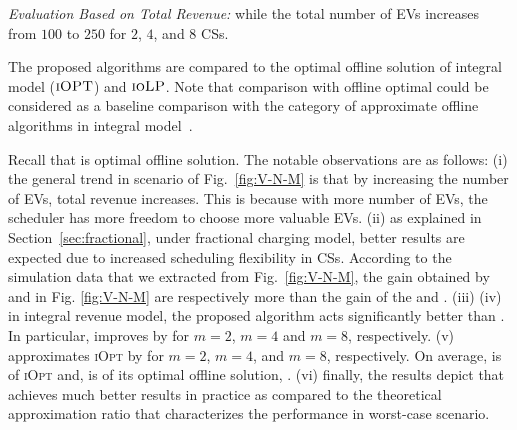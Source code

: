 \textit{Evaluation Based on Total Revenue:}
 while the total number of EVs increases from $100$ to $250$ for $2$, $4$, and $8$ CSs. 

The proposed algorithms are compared to the optimal offline solution of integral model ($\textsc{iOPT}$) and $\textsc{ioLP}$. Note that comparison with offline optimal could be considered as a baseline comparison with the category of approximate offline algorithms in integral model~\cite{yao2016real}.

Recall that \fcs is optimal offline solution. The notable observations  are  as  follows:  (i)  the  general  trend in scenario of Fig.~\ref{fig:V-N-M} is that  by increasing  the  number  of  EVs,  total  revenue  increases.  This is because with more number of EVs, the scheduler has more freedom to choose more valuable EVs. (ii)  as  explained in Section~\ref{sec:fractional}, under fractional charging model, better results are expected due to increased scheduling flexibility in CSs. According to the simulation data that we extracted from Fig.~\ref{fig:V-N-M}, the gain obtained by \fcs and \focs in Fig. \ref{fig:V-N-M} are respectively  more than the gain of the \ics and \iocs. (iii) 
 (iv) in integral revenue model, the proposed \iocs algorithm acts significantly better than \iolp. In particular, \iocs improves \iolp by  for $m=2$, $m=4$ and $m=8$, respectively. 
(v) \ics approximates \textsc{iOpt} by  for $m=2$, $m=4$, and $m=8$, respectively. On average, \iocs is  of \textsc{iOpt} and, \focs is  of its optimal offline solution, \fcs.  
(vi) finally, the results depict that \ics achieves much better results in practice as compared to the theoretical approximation ratio that characterizes the performance in worst-case scenario.

